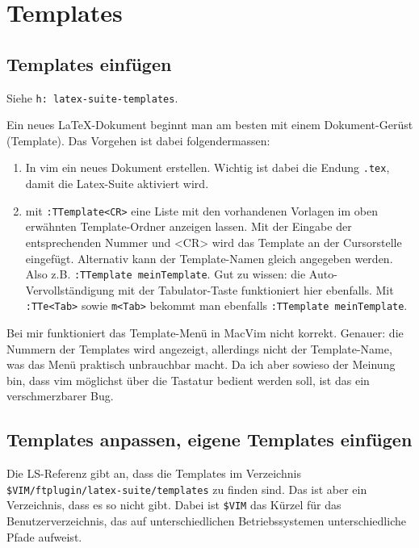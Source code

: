 \documentclass[a4paper,parskip=half,draft=true,DIV=15]{scrartcl}
\newcommand{\LS}{Latex-Suite}
\newcommand{\vimhNP}[1]{\texttt{h: #1}}
\begin{document}
\section{Templates}

\subsection{Templates einfügen}

Siehe \vimhNP{latex-suite-templates}.

Ein neues LaTeX-Dokument beginnt man am besten mit einem Dokument-Gerüst
(Template). Das Vorgehen ist dabei folgendermassen:

\begin{enumerate}
  
  \item In vim ein neues Dokument erstellen. Wichtig ist dabei die Endung
    \texttt{.tex}, damit die \LS{} aktiviert wird.

  \item mit \texttt{:TTemplate<CR>} eine Liste mit den vorhandenen
    Vorlagen im oben erwähnten Template-Ordner anzeigen lassen. Mit der
    Eingabe der entsprechenden Nummer und <CR> wird das Template an der
    Cursorstelle eingefügt. Alternativ kann der Template-Namen gleich angegeben
    werden. Also z.B. \texttt{:TTemplate meinTemplate}. Gut zu wissen: die
    Auto-Vervollständigung mit der Tabulator-Taste funktioniert hier ebenfalls.
    Mit \texttt{:TTe<Tab>} sowie \texttt{m<Tab>} bekommt man ebenfalls
    \texttt{:TTemplate meinTemplate}.

\end{enumerate}

Bei mir funktioniert das Template-Menü in MacVim nicht korrekt. Genauer: die Nummern der Templates
wird angezeigt, allerdings nicht der Template-Name, was das Menü praktisch unbrauchbar macht.
Da ich aber sowieso der Meinung bin, dass vim möglichst über die Tastatur bedient werden soll,
ist das ein verschmerzbarer Bug.

\subsection{Templates anpassen, eigene Templates einfügen}

Die LS-Referenz gibt an, dass die Templates im Verzeichnis \texttt{\$VIM/ftplugin/latex-suite/templates} zu finden sind.
Das ist aber ein Verzeichnis, dass es so nicht gibt.
Dabei ist \texttt{\$VIM} das Kürzel für das Benutzerverzeichnis, das auf unterschiedlichen Betriebssystemen unterschiedliche Pfade aufweist.
\end{document}
